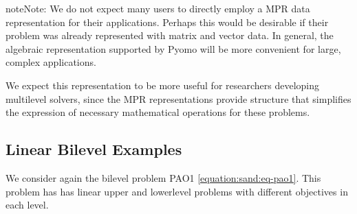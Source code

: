 \documentclass[letterpaper,10pt,english]{sphinxmanual}
\begin{document}
\begin{sphinxadmonition}{note}{Note:}
We do not expect many users to directly employ a MPR data
representation for their applications.  Perhaps this would be
desirable if their problem was already represented with matrix and
vector data.  In general, the algebraic representation supported by
Pyomo will be more convenient for large, complex applications.

We expect this representation to be more useful for researchers
developing multilevel solvers, since the MPR representations provide
structure that simplifies the expression of necessary mathematical
operations for these problems.
\end{sphinxadmonition}


\subsection{Linear Bilevel Examples}
\label{\detokenize{representations/mpr:linear-bilevel-examples}}
We consider again the bilevel problem PAO1 \eqref{equation:sand:eq-pao1}.  This problem
has has linear upper\sphinxhyphen{} and lower\sphinxhyphen{}level problems with different objectives
in each level.
\end{document}
